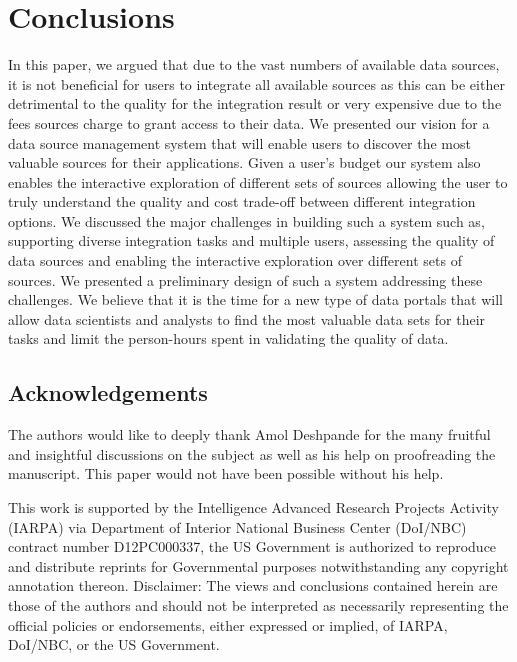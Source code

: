 \documentclass{sig-alternate}
\begin{document}
\section{Conclusions}
\label{sec:conclusion}
In this paper, we argued that due to the vast numbers of available data sources, it is not beneficial for users to integrate all available sources as this can be either detrimental to the quality for the integration result or very expensive due to the fees sources charge to grant access to their data. We presented our vision for a data source management system that will enable users to discover the most valuable sources for their applications. Given a user's budget our system also enables the interactive exploration of different sets of sources allowing the user to truly understand the quality and cost trade-off between different integration options. We discussed the major challenges in building such a system such as, supporting diverse integration tasks and multiple users, assessing the quality of data sources and enabling the interactive exploration over different sets of sources. We presented a preliminary design of such a system addressing these challenges. We believe that it is the time for a new type of data portals that will allow data scientists and analysts to find the most valuable data sets for their tasks and limit the person-hours spent in validating the quality of data. 

\subsection*{Acknowledgements}\vspace{-5pt}
The authors would like to deeply thank Amol Deshpande for the many fruitful and insightful discussions on the subject as well as his help on 
proofreading the manuscript. This paper would not have been possible without his help. 

This work is supported by the Intelligence Advanced Research Projects Activity (IARPA) via Department of Interior National Business Center (DoI/NBC) contract number D12PC000337, the US Government is authorized to reproduce and distribute reprints for Governmental purposes notwithstanding any copyright annotation thereon. Disclaimer: The views and conclusions contained herein are those of the authors and should
not be interpreted as necessarily representing the official policies or endorsements, either expressed or implied, of IARPA, DoI/NBC, or the
US Government.
\end{document}
